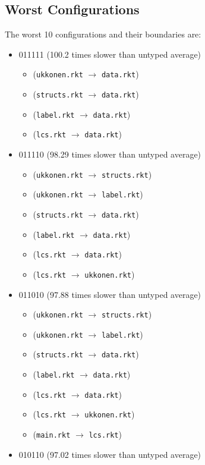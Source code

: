 \documentclass{article}
\newcommand{\mono}[1]{\texttt{#1}}
\begin{document}
\subsection{Worst Configurations}
The worst 10 configurations and their boundaries are:
\begin{itemize}
\item 011111 (100.2 times slower than untyped average)
  \begin{itemize}
  \item (\mono{ukkonen.rkt} $\rightarrow$ \mono{data.rkt})
  \item (\mono{structs.rkt} $\rightarrow$ \mono{data.rkt})
  \item (\mono{label.rkt} $\rightarrow$ \mono{data.rkt})
  \item (\mono{lcs.rkt} $\rightarrow$ \mono{data.rkt})
  \end{itemize}
\item 011110 (98.29 times slower than untyped average)
  \begin{itemize}
  \item (\mono{ukkonen.rkt} $\rightarrow$ \mono{structs.rkt})
  \item (\mono{ukkonen.rkt} $\rightarrow$ \mono{label.rkt})
  \item (\mono{structs.rkt} $\rightarrow$ \mono{data.rkt})
  \item (\mono{label.rkt} $\rightarrow$ \mono{data.rkt})
  \item (\mono{lcs.rkt} $\rightarrow$ \mono{data.rkt})
  \item (\mono{lcs.rkt} $\rightarrow$ \mono{ukkonen.rkt})
  \end{itemize}
\item 011010 (97.88 times slower than untyped average)
  \begin{itemize}
  \item (\mono{ukkonen.rkt} $\rightarrow$ \mono{structs.rkt})
  \item (\mono{ukkonen.rkt} $\rightarrow$ \mono{label.rkt})
  \item (\mono{structs.rkt} $\rightarrow$ \mono{data.rkt})
  \item (\mono{label.rkt} $\rightarrow$ \mono{data.rkt})
  \item (\mono{lcs.rkt} $\rightarrow$ \mono{data.rkt})
  \item (\mono{lcs.rkt} $\rightarrow$ \mono{ukkonen.rkt})
  \item (\mono{main.rkt} $\rightarrow$ \mono{lcs.rkt})
  \end{itemize}
\item 010110 (97.02 times slower than untyped average)

\end{itemize}
\end{document}
